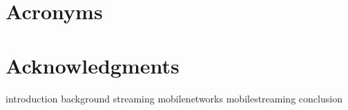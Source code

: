 \documentclass[openright,titlepage,numbers=noenddot,headinclude,footinclude=true,cleardoublepage=empty,BCOR=5mm,paper=A4,fontsize=11pt,twoside]{scrreprt}
\begin{document}




\newpage
{}
\tableofcontents

\newpage
{} %
{
\chapter*{Acronyms}

}

\newpage
{}
\listoffigures

\newpage
{}
\listoftables

\cleardoublepage


\cleardoublepage


\newtheorem{mydef}{Definition}
\cleardoublepage
\chapter*{Acknowledgments}

\cleardoublepage
{}


{introduction}
{background}
{streaming}
{mobilenetworks}
{mobilestreaming}
{conclusion}






\begingroup
\RaggedRight
\printbibliography
\endgroup

\end{document}
